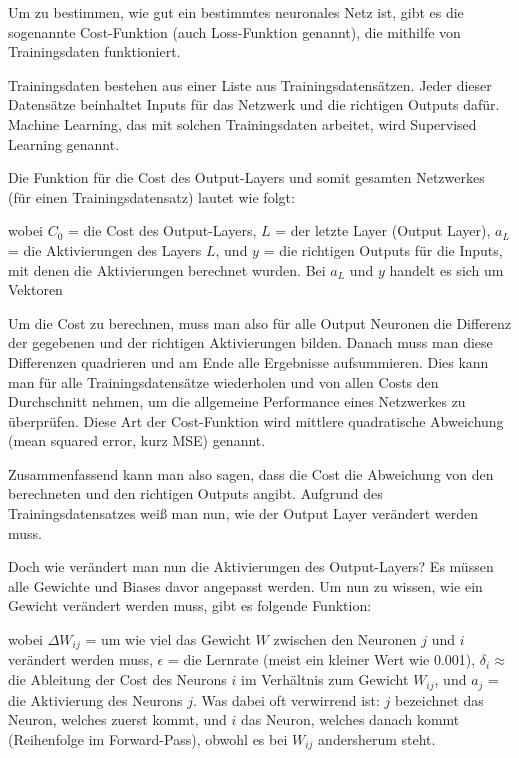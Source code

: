 \documentclass[11pt]{scrartcl}
\begin{document}

	Um zu bestimmen, wie gut ein bestimmtes neuronales Netz ist, gibt es die sogenannte Cost-Funktion (auch Loss-Funktion genannt), die mithilfe von Trainingsdaten funktioniert.
	
	Trainingsdaten bestehen aus einer Liste aus Trainingsdatensätzen. Jeder dieser Datensätze beinhaltet Inputs für das Netzwerk und die richtigen Outputs dafür. Machine Learning, das mit solchen Trainingsdaten arbeitet, wird Supervised Learning genannt.

	Die Funktion für die Cost des Output-Layers und somit gesamten Netzwerkes (für einen Trainingsdatensatz) lautet wie folgt:

	\form{ \[
		C_0 = (a_L - y)^2
	\]}


	\noindent wobei $C_0$ = die Cost des Output-Layers, $L$ = der letzte Layer (Output Layer), $a_L$ = die Aktivierungen des Layers $L$, und $y$ = die richtigen Outputs für die Inputs, mit denen die Aktivierungen berechnet wurden. 
	Bei $a_L$ und $y$ handelt es sich um Vektoren
	
	Um die Cost zu berechnen, muss man also für alle Output Neuronen die Differenz der gegebenen und der richtigen Aktivierungen bilden. Danach muss man diese Differenzen quadrieren und am Ende alle Ergebnisse aufsummieren. Dies kann man für alle Trainingsdatensätze wiederholen und von allen Costs den Durchschnitt nehmen, um die allgemeine Performance eines Netzwerkes zu überprüfen. Diese Art der Cost-Funktion wird mittlere quadratische Abweichung (mean squared error, kurz MSE) genannt. 
	
	Zusammenfassend kann man also sagen, dass die Cost die Abweichung von den berechneten und den richtigen Outputs angibt. Aufgrund des Trainingsdatensatzes weiß man nun, wie der Output Layer verändert werden
	muss.


	Doch wie verändert man nun die Aktivierungen des Output-Layers? Es müssen alle Gewichte und Biases davor angepasst werden. Um nun zu wissen, wie ein Gewicht verändert werden muss, gibt es folgende Funktion:

	\form{\[
		\Delta W_{ij} = \epsilon * \delta_i * a_j
	\]}

	wobei $\Delta W_{ij}$ = um wie viel das Gewicht $W$ zwischen den Neuronen $j$ und $i$ verändert werden muss, $\epsilon$ = die Lernrate (meist ein kleiner Wert wie 0.001), $\delta_i \approx$ die Ableitung der Cost des Neurons $i$ im Verhältnis zum Gewicht $W_{ij}$, und $a_j$ = die Aktivierung des Neurons $j$. Was dabei oft verwirrend ist: $j$ bezeichnet das Neuron, welches zuerst kommt, und $i$ das Neuron, welches danach kommt (Reihenfolge im Forward-Pass), obwohl es bei $W_{ij}$ andersherum steht.
\end{document}
